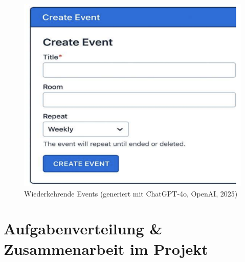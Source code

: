 \documentclass[a4paper,12pt]{article}
\begin{document}
\begin{figure}[H]
    \centering
    \includegraphics[width=1\textwidth]{Abbildungen/wiederkehrende_events.png}
    \caption{Wiederkehrende Events (generiert mit ChatGPT-4o, OpenAI, 2025)}
    \label{fig:wiederkehrende_events}
\end{figure}

\newpage


\section{Aufgabenverteilung \& Zusammenarbeit im Projekt}
\end{document}
